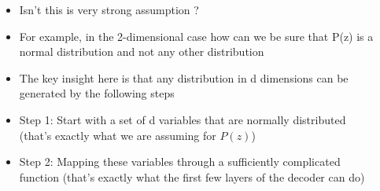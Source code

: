 \begin{frame}
\begin{columns}
\begin{overlayarea}{\textwidth}{\textheight}
		\end{overlayarea}
		\begin{overlayarea}{\textwidth}{\textheight}
			\begin{itemize}\justifying
				\item<1-> Isn't this is very strong assumption ?
				\item<2-> For example, in the 2-dimensional case how can we be sure that P(z) is a normal distribution and not any other distribution
				\item<3-> The key insight here is that any distribution in d dimensions can be generated by the following steps
				\item<4-> Step 1: Start with a set of d variables that are normally distributed (that's exactly what we are assuming for $P(z)$)
				\item<5-> Step 2: Mapping these variables through a sufficiently complicated function (that's exactly what the first few layers of the decoder can do)
			\end{itemize}
		\end{overlayarea}
	\end{columns}
\end{frame}


